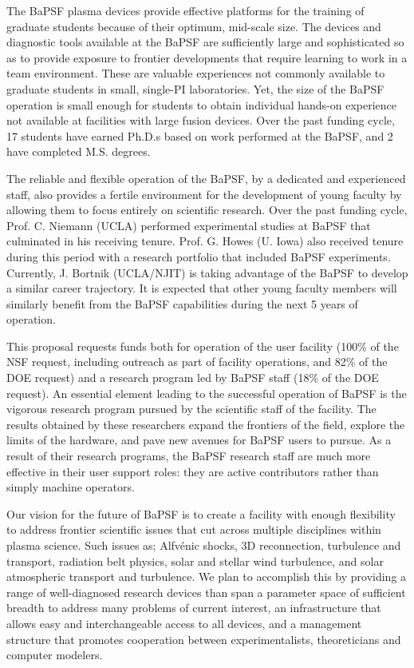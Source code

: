 \documentclass[11pt]{article}
\begin{document}
The BaPSF plasma devices provide effective platforms for the training
of graduate students because of their optimum, mid-scale size. The
devices and diagnostic tools available at the BaPSF are sufficiently
large and sophisticated so as to provide exposure to frontier
developments that require learning to work in a team
environment. These are valuable experiences not commonly available to
graduate students in small, single-PI laboratories. Yet, the size of
the BaPSF operation is small enough for students to obtain individual
hands-on experience not available at facilities with large fusion
devices. Over the past funding cycle, 17 students have earned Ph.D.s
based on work performed at the BaPSF, and 2 have completed
M.S. degrees.

The reliable and flexible operation of the BaPSF, by a dedicated and
experienced staff, also provides a fertile environment for the
development of young faculty by allowing them to focus entirely on
scientific research. Over the past funding cycle, Prof. C. Niemann
(UCLA) performed experimental studies at BaPSF that culminated in his
receiving tenure. Prof. G. Howes (U. Iowa) also received tenure during
this period with a research portfolio that included BaPSF experiments.
Currently, J. Bortnik (UCLA/NJIT) is taking advantage of the BaPSF to develop
a similar career trajectory. It is expected that other young faculty
members will similarly benefit from the BaPSF capabilities during the
next 5 years of operation.

This proposal requests funds both for operation of the user facility
(100\% of the NSF request, including outreach as part of facility
operations, and 82\% of the DOE request) and a research program led by
BaPSF staff (18\% of the DOE request).  An essential element leading
to the successful operation of BaPSF is the vigorous research program
pursued by the scientific staff of the facility. The results obtained
by these researchers expand the frontiers of the field, explore the
limits of the hardware, and pave new avenues for BaPSF users to
pursue. As a result of their research programs, the BaPSF research
staff are much more effective in their user support roles: they are
active contributors rather than simply machine operators.

Our vision for the future of BaPSF is to create a facility with enough
flexibility to address frontier scientific issues that cut across
multiple disciplines within plasma science. Such issues as; Alfv\'{e}nic
shocks, 3D reconnection, turbulence and transport, radiation belt
physics, solar and stellar wind turbulence, and solar atmospheric
transport and turbulence. We plan to accomplish this by providing a
range of well-diagnosed research devices than span a parameter space
of sufficient breadth to address many problems of current interest, an
infrastructure that allows easy and interchangeable access to all
devices, and a management structure that promotes cooperation between
experimentalists, theoreticians and computer modelers.
\end{document}
